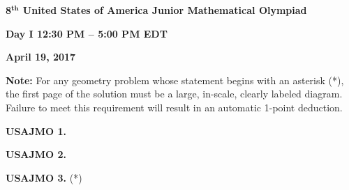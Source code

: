 \documentclass{article}
\newcommand{\pdb}[1]{\unskip}
\begin{document}
\thispagestyle{empty}
{   
    \centering
    \large
    \textbf{8$^{\textbf{th}}$ United States of America Junior Mathematical Olympiad}
\par}

{
    \centering
    \large
    \textbf{Day I \hspace{4mm} 12:30 PM -- 5:00 PM EDT}
\par}

{
    \centering
    \large
    \textbf{April 19, 2017}
\par}
\vspace{5mm}
\textbf{Note:} For any geometry problem whose statement begins with an asterisk (*), the first page of the solution must be a large, in-scale, clearly labeled diagram. Failure to meet this requirement will result in an automatic 1-point deduction.

\vspace{15mm}

\textbf{USAJMO 1.} \pdb{USAJMO-2017-1}

\vspace{15mm}

\textbf{USAJMO 2.} \pdb{USAJMO-2017-2}

\vspace{15mm}

\textbf{USAJMO 3.} (*) \pdb{USAJMO-2017-3}
\end{document}
